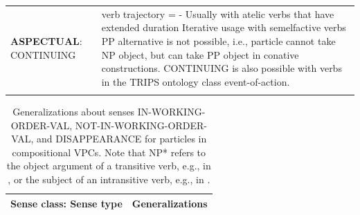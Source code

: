 \documentclass[output=paper,modfonts,nonflat]{langsci/langscibook}
\begin{document}
\begin{table}[ht]
\begin{tabular}{p{1in}p{3.5in}}
  \textbf{ASPECTUAL}: \newline CONTINUING
   & verb trajectory = - \newline Usually with atelic verbs that have extended duration \newline Iterative usage with semelfactive verbs \newline PP alternative is not possible, i.e., particle cannot take NP object, but can take PP object in conative constructions. \newline CONTINUING is also possible with verbs in the TRIPS ontology class event-of-action.\\ 
  \lspbottomrule
 \end{tabular}%
\end{table}

\begin{table}[ht]%
\caption{Generalizations about senses IN-WORKING-ORDER-VAL, NOT-IN-WORKING-ORDER-VAL, and DISAPPEARANCE for particles in compositional VPCs. Note that NP* refers to the object argument of a transitive verb, e.g.,  in , or the subject of an intransitive verb, e.g.,  in .}
\label{tab:1:findings-prtcls-3senses}
\small
 \begin{tabular}{p{1.3in}p{3.2in}}
  \lsptoprule
   \textbf{Sense class}: \newline Sense type
        & Generalizations\\
    \midrule


\end{tabular}
\end{table}
\end{document}
